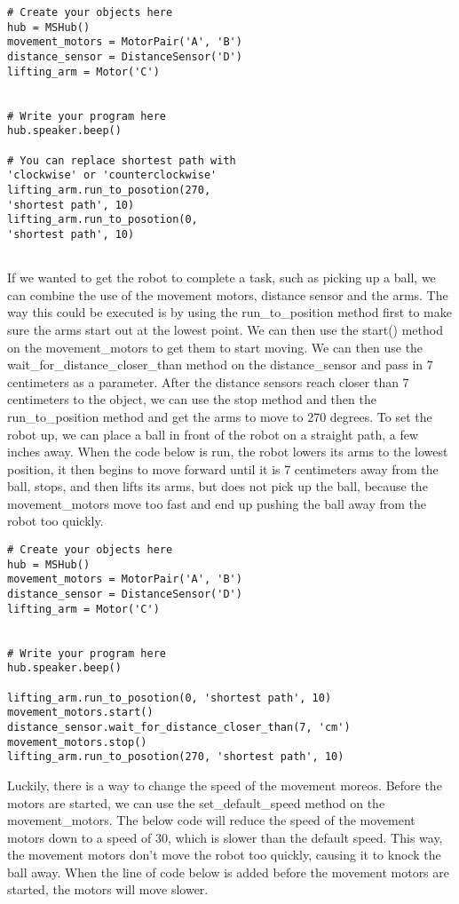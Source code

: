\documentclass[10pt,twocolumn]{article}
\begin{document}
\begin{verbatim}
# Create your objects here
hub = MSHub()
movement_motors = MotorPair('A', 'B')
distance_sensor = DistanceSensor('D')
lifting_arm = Motor('C')
     
     
# Write your program here
hub.speaker.beep()
     
# You can replace shortest path with 
'clockwise' or 'counterclockwise'
lifting_arm.run_to_posotion(270, 
'shortest path', 10)
lifting_arm.run_to_posotion(0, 
'shortest path', 10)
    
\end{verbatim}
    
If we wanted to get the robot to complete a task, such as picking up a ball, we can combine the use of the movement motors, distance sensor and the arms. The way this could be executed is by using the  run\_to\_position method first to make sure the arms start out at the lowest point. We can then use the start() method on the movement\_motors to get them to start moving. We can then use the wait\_for\_distance\_closer\_than method on the distance\_sensor and pass in 7 centimeters as a parameter. After the distance sensors reach closer than 7 centimeters to the object, we can use the stop method and then the run\_to\_position method and get the arms to move to 270 degrees. To set the robot up, we can place a ball in front of the robot on a straight path, a few inches away. When the code below is run, the robot lowers its arms to the lowest position, it then begins to move forward until it is 7 centimeters away from the ball, stops, and then lifts its arms, but does not pick up the ball, because the movement\_motors move too fast and end up pushing the ball away from the robot too quickly. 

\begin{verbatim}
# Create your objects here
hub = MSHub()
movement_motors = MotorPair('A', 'B')
distance_sensor = DistanceSensor('D')
lifting_arm = Motor('C')
     
     
# Write your program here
hub.speaker.beep()
     
lifting_arm.run_to_posotion(0, 'shortest path', 10)
movement_motors.start()
distance_sensor.wait_for_distance_closer_than(7, 'cm')
movement_motors.stop()
lifting_arm.run_to_posotion(270, 'shortest path', 10)
\end{verbatim}
    
Luckily, there is a way to change the speed of the movement moreos. Before the motors are started, we can use the set\_default\_speed method on the movement\_motors. The below code will reduce the speed of the movement motors down to a speed of 30, which is slower than the default speed. This way, the movement motors don’t move the robot too quickly, causing it to knock the ball away. When the line of code below is added before the movement motors are started, the motors will move slower. 
\end{document}
